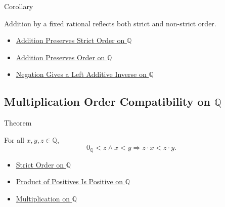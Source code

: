\begin{corollarybox}{Corollary}
\begin{corollary}
\label{cor:addition-reflects-order-on-q}
Addition by a fixed rational reflects both strict and non-strict order.
\end{corollary}
\end{corollarybox}

\begin{dependencies}
\begin{itemize}
  \item \hyperref[thm:addition-preserves-strict-order-on-q]{Addition Preserves Strict Order on $\mathbb{Q}$}
  \item \hyperref[thm:addition-preserves-order-on-q]{Addition Preserves Order on $\mathbb{Q}$}
  \item \hyperref[thm:negation-left-additive-inverse-on-q]{Negation Gives a Left Additive Inverse on $\mathbb{Q}$}
\end{itemize}
\end{dependencies}

\subsection*{\texorpdfstring{Multiplication Order Compatibility on $\mathbb{Q}$}{Multiplication Order Compatibility on Q}}

\begin{theorembox}{Theorem}
\begin{theorem}
\label{thm:left-positive-multiplication-preserves-strict-order-on-q}
For all $x,y,z\in\mathbb{Q}$,
\[
0_{\mathbb{Q}}<z\land x<y
\Longrightarrow
z\cdot x<z\cdot y.
\]
\end{theorem}
\end{theorembox}

\begin{dependencies}
\begin{itemize}
  \item \hyperref[def:strict-order-on-q]{Strict Order on $\mathbb{Q}$}
  \item \hyperref[prop:product-of-positives-is-positive-q]{Product of Positives Is Positive on $\mathbb{Q}$}
  \item \hyperref[def:multiplication-on-q-classes]{Multiplication on $\mathbb{Q}$}
\end{itemize}
\end{dependencies}

